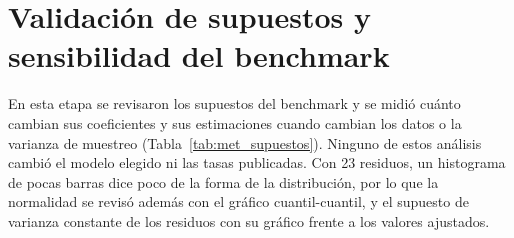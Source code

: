 \section{Validación de supuestos y sensibilidad del benchmark}
\label{sec:met_supuestos}

En esta etapa se revisaron los supuestos del benchmark y se midió cuánto cambian sus coeficientes y sus estimaciones cuando cambian los datos o la varianza de muestreo (Tabla~\ref{tab:met_supuestos}). Ninguno de estos análisis cambió el modelo elegido ni las tasas publicadas. Con 23 residuos, un histograma de pocas barras dice poco de la forma de la distribución, por lo que la normalidad se revisó además con el gráfico cuantil-cuantil, y el supuesto de varianza constante de los residuos con su gráfico frente a los valores ajustados.

